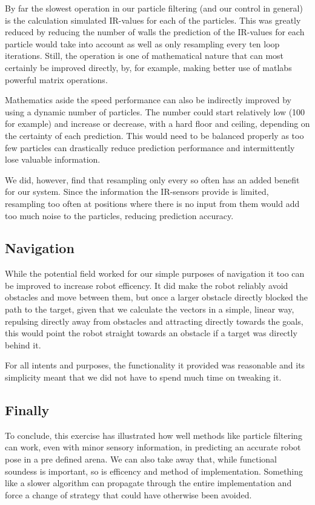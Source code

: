 \documentclass[paper=a4, fontsize=12pt]{scrartcl}	%
\numberwithin{equation}{section}		%
\numberwithin{figure}{section}			%
\numberwithin{table}{section}				%
\begin{document}
By far the slowest operation in our particle filtering (and our control in general) is the calculation simulated IR-values for each of the particles. This was greatly reduced by reducing the number of walls the prediction of the IR-values for each particle would take into account as well as only resampling every ten loop iterations. Still, the operation is one of mathematical nature that can most certainly be improved directly, by, for example, making better use of matlabs powerful matrix operations.

Mathematics aside the speed performance can also be indirectly improved by using a dynamic number of particles. The number could start relatively low (100 for example) and increase or decrease, with a hard floor and ceiling, depending on the certainty of each prediction. This would need to be balanced properly as too few particles can drastically reduce prediction performance and intermittently lose valuable information.

We did, however, find that resampling only every so often has an added benefit for our system. Since the information the IR-sensors provide is limited, resampling too often at positions where there is no input from them would add too much noise to the particles, reducing prediction accuracy.
\subsection{Navigation}
While the potential field worked for our simple purposes of navigation it too can be improved to increase robot efficency. It did make the robot reliably avoid obstacles and move between them, but once a larger obstacle directly blocked the path to the target, given that we calculate the vectors in a simple, linear way, repulsing directly away from obstacles and attracting directly towards the goals, this would point the robot straight towards an obstacle if a target was directly behind it.

For all intents and purposes, the functionality it provided was reasonable and its simplicity meant that we did not have to spend much time on tweaking it.
\subsection{Finally}
To conclude, this exercise has illustrated how well methods like particle filtering can work, even with minor sensory information, in predicting an accurate robot pose in a pre defined arena. We can also take away that, while functional soundess is important, so is efficency and method of implementation. Something like a slower algorithm can propagate through the entire implementation and force a change of strategy that could have otherwise been avoided.
\end{document}
